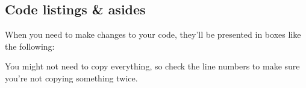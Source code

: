 \subsection*{Code listings \& asides}
	
	When you need to make changes to your code, they'll be presented in boxes like the following:

	
	
	You might not need to copy everything, so check the line numbers to make sure you're not copying something twice.